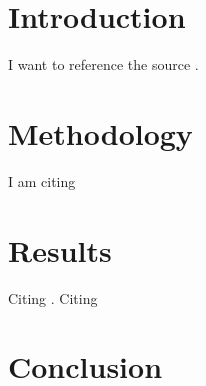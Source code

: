 \documentclass[12pt]{article}
\begin{document}

\pagebreak
\tableofcontents
\listoftables
\listoffigures

\pagebreak
\section{Introduction}
I want to reference the source \cite{Alamerie2014}.
\lipsum[10]

\section{Methodology}
\lipsum[50] 
I am citing \cite{Giller2021}

\section{Results}
\lipsum[50]
Citing \cite{Pant2016}. Citing \cite{Russel2012}

\section{Conclusion}
\lipsum[20]

\printbibliography
\end{document}
